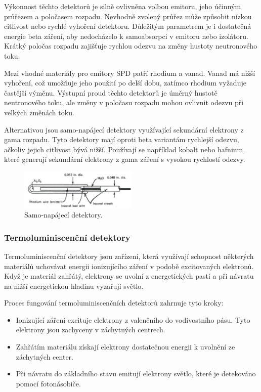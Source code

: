 Výkonnost těchto detektorů je silně ovlivněna volbou emitoru, jeho účinným průřezem a poločasem rozpadu. Nevhodně zvolený průřez může způsobit nízkou citlivost nebo rychlé vyhoření detektoru. Důležitým parametrem je i dostatečná energie beta záření, aby nedocházelo k samoabsorpci v emitoru nebo izolátoru. Krátký poločas rozpadu zajišťuje rychlou odezvu na změny hustoty neutronového toku.

Mezi vhodné materiály pro emitory SPD patří rhodium a vanad. Vanad má nižší vyhoření, což umožňuje jeho použití po delší dobu, zatímco rhodium vyžaduje častější výměnu. Výstupní proud těchto detektorů je úměrný hustotě neutronového toku, ale změny v poločasu rozpadu mohou ovlivnit odezvu při velkých změnách toku.

Alternativou jsou samo-napájecí detektory využívající sekundární elektrony z gama rozpadu. Tyto detektory mají oproti beta variantám rychlejší odezvu, ačkoliv jejich citlivost bývá nižší. Používají se například kobalt nebo hafnium, které generují sekundární elektrony z gama záření s vysokou rychlostí odezvy.

\begin{figure}[H] 
    \centering
    \includegraphics[width=0.5\textwidth]{img/SPD_1.png}
    \caption{Samo-napájecí detektory.}
    \label{fig:SPDKonstrukce}
\end{figure}

\subsubsection{Termoluminiscenční detektory}

Termoluminiscenční detektory jsou zařízení, která využívají schopnost některých materiálů uchovávat energii ionizujícího záření v podobě excitovaných elektronů. Když je materiál zahřátý, elektrony se uvolní z energetických pastí a při návratu na nižší energetickou hladinu vyzařují světlo.

Proces fungování termoluminiscenčních detektorů zahrnuje tyto kroky:

\begin{itemize}
    \item Ionizující záření excituje elektrony z valenčního do vodivostního pásu. Tyto elektrony jsou zachyceny v záchytných centrech.
    \item Zahřátím materiálu získají elektrony dostatečnou energii k uvolnění ze záchytných center.
    \item Při návratu do základního stavu emitují elektrony světlo, které je detekováno pomocí fotonásobiče.
\end{itemize}

